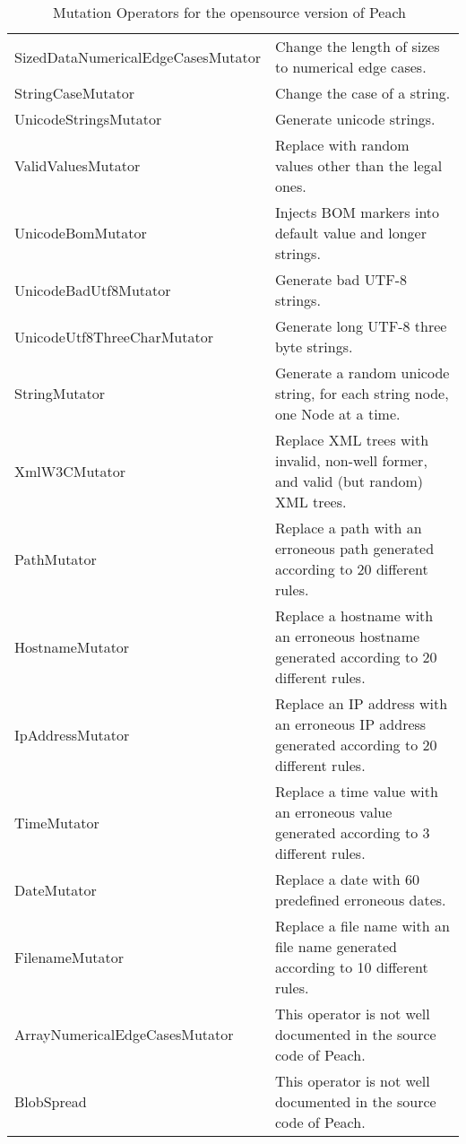 \begin{table}[h]
\begin{center}
\begin{tabular}{|p{5cm}|p{9cm}|}
SizedDataNumericalEdgeCasesMutator&Change the length of sizes to numerical edge cases.\\
StringCaseMutator&Change the case of a string.\\
UnicodeStringsMutator&Generate unicode strings.\\
ValidValuesMutator&Replace with random values other than the legal ones.\\
UnicodeBomMutator&Injects BOM markers into default value and longer strings.\\
UnicodeBadUtf8Mutator&Generate bad UTF-8 strings.\\
UnicodeUtf8ThreeCharMutator&Generate long UTF-8 three byte strings.\\
StringMutator&Generate a random unicode string, for each string node, one Node at a time.\\
XmlW3CMutator&Replace XML trees with invalid, non-well former, and valid (but random) XML trees.\\
PathMutator&Replace a path with an erroneous path generated according to 20 different rules.\\
HostnameMutator&Replace a hostname with an erroneous hostname generated according to 20 different rules.\\
IpAddressMutator&Replace an IP address with an erroneous IP address generated according to 20 different rules.\\
TimeMutator&Replace a time value with an erroneous value generated according to 3 different rules.\\
DateMutator&Replace a date with 60 predefined erroneous dates.\\ 
FilenameMutator&Replace a file name with an file name generated according to 10 different rules.\\
ArrayNumericalEdgeCasesMutator&This operator is not well documented in the source code of Peach.\\
BlobSpread&This operator is not well documented in the source code of Peach.\\
\hline
\end{tabular}
\end{center}
\caption{Mutation Operators for the opensource version of Peach~\cite{PeachMozilla}}
\label{table:PeachOperators}
\end{table}%